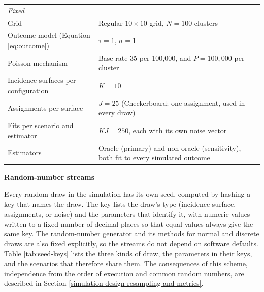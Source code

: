 \documentclass[11pt]{article}
\newcommand{\sihead}[1]{\par\medskip\noindent\textbf{#1}\par\nopagebreak\noindent\ignorespaces}
\begin{document}
\begin{table}[!htb]
\begin{tabular}{p{5.8cm}p{7.6cm}c}
\midrule
\multicolumn{3}{l}{\textit{Fixed}} \\
Grid & Regular $10\times10$ grid, $N = 100$ clusters & \\
Outcome model (Equation \ref{eq:outcome}) & $\tau = 1$, $\sigma = 1$ & \\
Poisson mechanism & Base rate 35 per 100,000, and $P = 100{,}000$ per cluster & \\
Incidence surfaces per configuration & $K = 10$ & \\
Assignments per surface & $J = 25$ (Checkerboard: one assignment, used in every draw) & \\
Fits per scenario and estimator & $KJ = 250$, each with its own noise vector & \\
Estimators & Oracle (primary) and non-oracle (sensitivity), both fit to every simulated outcome & \\

\bottomrule

\end{tabular}

\end{table}
\iffullsi

\sihead{Random-number streams}
Every random draw in the simulation has
its own seed, computed by hashing a key that names the draw. The key
lists the draw's type (incidence surface, assignments, or noise) and the
parameters that identify it, with numeric values written to a fixed
number of decimal places so that equal values always give the same key.
The random-number generator and its methods for normal and discrete
draws are also fixed explicitly, so the streams do not depend on
software defaults. Table \ref{tab:seed-keys} lists the three kinds of
draw, the parameters in their keys, and the scenarios that therefore
share them. The consequences of this scheme, independence from the order
of execution and common random numbers, are described in Section \ref{simulation-design-resampling-and-metrics}.
\end{document}
